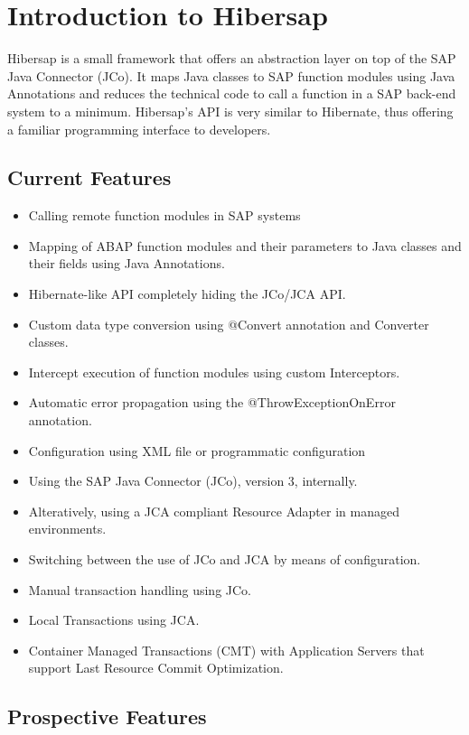 \chapter{Introduction to Hibersap}

  Hibersap is a small framework that offers an abstraction layer on top of the SAP Java Connector (JCo).
  It maps Java classes to SAP function modules using Java Annotations and reduces the technical code
  to call a function in a SAP back-end system to a minimum. 
  Hibersap's API is very similar to Hibernate, thus offering a familiar programming interface to developers.  

\section*{Current Features}

\begin{itemize}
  \item Calling remote function modules in SAP systems
  \item Mapping of ABAP function modules and their parameters to Java classes and their fields using Java Annotations.
  \item Hibernate-like API completely hiding the JCo/JCA API.
  \item Custom data type conversion using @Convert annotation and Converter classes.
  \item Intercept execution of function modules using custom Interceptors.
  \item Automatic error propagation using the @ThrowExceptionOnError annotation.
  \item Configuration using XML file or programmatic configuration
  \item Using the SAP Java Connector (JCo), version 3, internally.
  \item Alteratively, using a JCA compliant Resource Adapter in managed environments.
  \item Switching between the use of JCo and JCA by means of configuration.
  \item Manual transaction handling using JCo.
  \item Local Transactions using JCA.
  \item Container Managed Transactions (CMT) with Application Servers that support Last Resource Commit Optimization.
\end{itemize}


\section*{Prospective Features}

